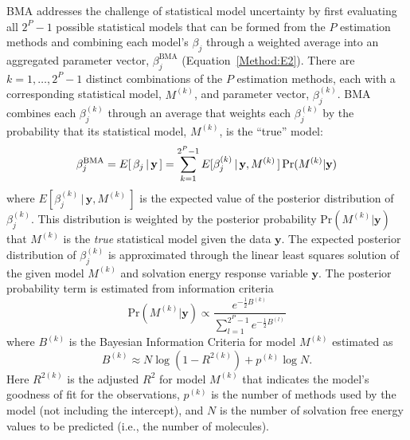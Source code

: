 \documentclass[journal=jpcbfk, manuscript=article]{achemso}
\newcommand{\LG}[1]{\textcolor{black}{#1}}
\newcommand{\+}[1]{\ensuremath{\mathbf{#1}}}
\renewcommand{\vec}[1]{{\mathbf{#1}}}
\begin{document}
BMA addresses the challenge of statistical model uncertainty by first evaluating all $2^{P}-1$ possible statistical models that can be formed from the $P$ estimation methods and combining each model's $\beta_j$ through a weighted average into an aggregated parameter vector, $\beta_j^{\text{BMA}}$ (Equation~\ref{Method:E2}).
There are $k = 1, \ldots, 2^P-1$ distinct combinations of the $P$ estimation methods, each with a corresponding statistical model, $M^{(k)}$, and parameter vector, $\beta^{(k)}_j$. 
BMA combines each $\beta_{j}^{(k)}$ through an average that weights each $\beta^{(k)}_j$ by the probability that its statistical model, $M^{(k)}$, is the ``true'' model:
\begin{equation} \label{Method:E2}
	\LG{\beta_j^{\text{BMA}} = E[\,\beta_j \,|\, \+y\,]  = \sum_{k=1}^{2^P-1} E[\beta_{j}^{(k)}\,|\, \+y,M^{(k)}\,] \, {\mathrm{Pr}}(M^{(k)} | \+y)}
\end{equation}
where $E[\beta_{j}^{(k)}\,|\, \+y,M^{(k)}\,]$ is the expected value of the posterior distribution of $\beta^{(k)}_j$.
This distribution is weighted by the posterior probability ${\mathrm{Pr}}(M^{(k)} | \+y)$ that $M^{(k)}$ is the \emph{true} statistical model given the data $\textbf{y}$.
The expected posterior distribution of $\beta^{(k)}_j$ is approximated through the linear least squares solution of the given model $M^{(k)}$ and solvation energy response variable $\vec{y}$.
The posterior probability term is estimated from information criteria \cite{Raftery:1995}
\begin{equation} \label{Method:E3} 
	{\mathrm{Pr}}(M^{(k)} | \+y) \propto \frac{e^{-\frac{1}{2}B^{(k)}}}{\sum^{2^P-1}_{l=1} e^{-\frac{1}{2}B^{(l)}}} 
\end{equation}
where $B^{(k)}$ is the Bayesian Information Criteria for model $M^{(k)}$ estimated as
\begin{equation} \label{Method:E4} 
	B^{(k)} \approx N \log{(1-R^{2(k)})} + p^{(k)} \log{N}.
\end{equation}
Here $R^{2(k)}$ is the adjusted $R^2$ for model $M^{(k)}$ that indicates the model's goodness of fit for the observations, $p^{(k)}$ is the number of methods used by the model (not including the intercept), and $N$ is the number of solvation free energy values to be predicted (i.e., the number of molecules). 
\end{document}
